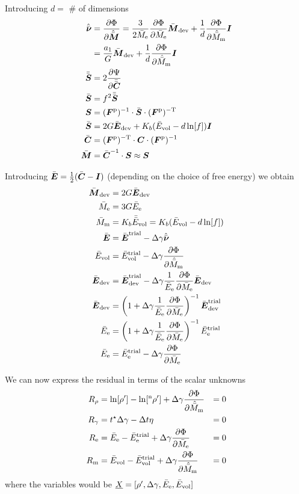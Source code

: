 \documentclass[a4paper,11pt]{article}
\newcommand{\ts}[1]{\text{\boldmath $#1$}}
\newcommand{\pderiv}[2]{\frac{\partial #1}{\partial #2}}
\newcommand{\dev}{{\rm dev}}
\newcommand{\vol}{{\rm vol}}
\newcommand{\trial}{{\rm trial}}
\newcommand{\rme}{{\rm e}}
\newcommand{\rmm}{{\rm m}}
\newcommand{\rmp}{{\rm p}}
\newcommand{\rmT}{{\rm T}}
\newcommand{\old}{{}^{\rm n}}
\begin{document}
Introducing $d = $ \# of dimensions
\begin{align*}
	\hat{\bar{\ts\nu}} &= \pderiv{\Phi}{\hat{\bar{\ts M}}} = 
		\frac{3}{2\bar M_\rme}\pderiv{\Phi}{\bar M_\rme}\bar{\ts M}_\dev+\frac1d\pderiv{\Phi}{\hat{\bar M}_\rmm} \ts I\\
			&= \frac{a_1}{G}\bar{\ts M}_\dev+\frac1d\pderiv{\Phi}{\hat{\bar M}_\rmm} \ts I\\
	\bar{\bar{\ts S}} &= 2\pderiv{\Psi}{\bar{\bar{\ts C}}}\\
	\bar{\ts S} &= f^2 \bar{\bar{\ts S}}\\
	\ts S &= (\ts F^\rmp)^{-1}\cdot\bar{\ts S}\cdot(\ts F^\rmp)^{-\rmT}\\
	\bar{\ts S} &= 2G \bar{\ts E}_\dev + K_b(\bar E_\vol -d\ln[f])\ts I\\
	\bar{\ts C} &= (\ts F^\rmp)^{-\rmT}\cdot\ts C\cdot(\ts F^\rmp)^{-1}\\
	\bar{\ts M} &= \bar{\ts C}^{-1}\cdot\ts S \approx \ts S
\end{align*}

Introducing  $\bar{\ts E} = \frac12(\bar{\ts C} - \ts I)$ (depending on the choice of free energy) we obtain
\begin{align*}
	\bar{\ts M}_\dev &= 2G\bar{\ts E}_\dev\\
	\bar M_\rme &= 3G\bar{E}_\rme\\
	\bar M_\rmm &= K_b\bar{\bar{E}}_\vol = K_b(\bar E_\vol - d \ln[f])\\
	\bar{\ts E} &= \bar{\ts E}^\trial - \Delta\gamma\hat{\bar{\ts\nu}}\\
	\bar{E}_\vol &= \bar{E}^\trial_\vol - 
		 \Delta\gamma\pderiv{\Phi}{\hat{\bar M}_\rmm}\\
	\bar{\ts E}_\dev &= \bar{\ts E}^\trial_\dev - 
		\Delta\gamma\frac{1}{\bar{E}_\rme}\pderiv{\Phi}{\bar{M}_\rme}\bar{\ts E}_\dev\\
	\bar{\ts E}_\dev &= \left(1+\Delta\gamma\frac{1}{\bar{E}_\rme}\pderiv{\Phi}{\bar{M}_\rme}\right)^{-1}\bar{\ts E}^\trial_\dev\\
	\bar{E}_\rme &= \left(1+\Delta\gamma\frac{1}{\bar{E}_\rme}\pderiv{\Phi}{\bar{M}_\rme}\right)^{-1}\bar{E}^\trial_\rme\\
	\bar{E}_\rme &= \bar{E}^\trial_\rme - \Delta\gamma\pderiv{\Phi}{\bar{M}_\rme}
\end{align*}

We can now express the residual in terms of the scalar unknowns
\begin{align*}
	R_\rho &= \ln[\rho']-\ln[\old\rho']+\Delta\gamma\pderiv{\Phi}{\hat{\bar M}_\rmm} &= 0\\
	R_\gamma &= t^\star \Delta\gamma - \Delta t \eta &= 0\\
	R_\rme &= \bar E_\rme - \bar E_\rme^\trial + \Delta\gamma \pderiv{\Phi}{\bar M_\rme}&= 0\\
	R_\rmm &= \bar E_\vol - \bar E_\vol^\trial + \Delta\gamma \pderiv{\Phi}{\hat{\bar M}_\rmm}&= 0
\end{align*}
where the variables would be $\underline{X} = [\rho', \Delta\gamma, \bar E_\rme, \bar E_\vol]$
\end{document}
